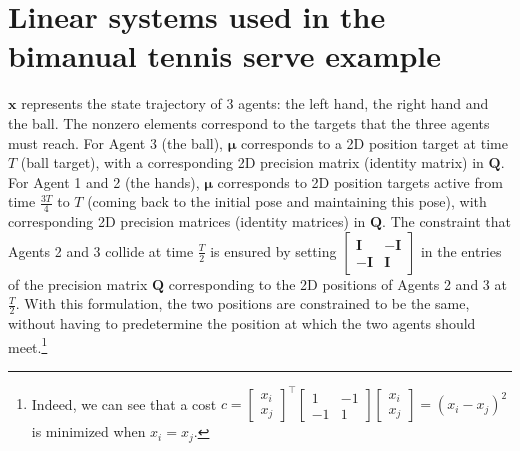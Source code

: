 \documentclass[10pt,a4paper]{article} %
\newcommand{\trsp}{{\scriptscriptstyle\top}}
\begin{document}
\section{Linear systems used in the bimanual tennis serve example}\label{app:tennis}

$\bm{x}$ represents the state trajectory of 3 agents: the left hand, the right hand and the ball.
The nonzero elements correspond to the targets that the three agents must reach. 
For Agent 3 (the ball), $\bm{\mu}$ corresponds to a 2D position target at time $T$ (ball target), with a corresponding 2D precision matrix (identity matrix) in $\bm{Q}$. For Agent 1 and 2 (the hands), $\bm{\mu}$ corresponds to 2D position targets active from time $\frac{3T}{4}$ to $T$ (coming back to the initial pose and maintaining this pose), with corresponding 2D precision matrices (identity matrices) in $\bm{Q}$.
The constraint that Agents 2 and 3 collide at time $\frac{T}{2}$ is ensured by setting $\left[\begin{smallmatrix}\bm{I}&-\bm{I}\\-\bm{I}&\bm{I}\end{smallmatrix}\right]$ in the entries of the precision matrix $\bm{Q}$ corresponding to the 2D positions of Agents 2 and 3 at $\frac{T}{2}$. With this formulation, the two positions are constrained to be the same, without having to predetermine the position at which the two agents should meet.\footnote{Indeed, we can see that a cost $c\!=\!\left[\begin{smallmatrix}x_i\\x_j\end{smallmatrix}\right]^\trsp\left[\begin{smallmatrix}1&-1\\-1&1\end{smallmatrix}\right]\left[\begin{smallmatrix}x_i\\x_j\end{smallmatrix}\right]\!=\!(x_i-x_j)^2$ is minimized when $x_i\!=\!x_j$.} 
\end{document}

